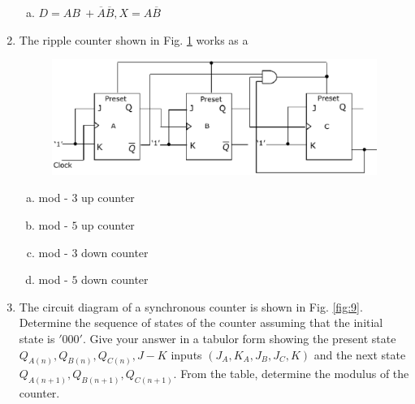 \documentclass[journal,12pt,twocolumn]{IEEEtran}
\begin{document}
\begin{enumerate}
\begin{enumerate}[(a)]
\item $
D = AB \ +  \overline{A} \overline{B}, X  =  A \overline{B} 
$


\end{enumerate}

\item The ripple counter shown in Fig. \ref{fig:8} works as a

\begin{figure}

\centering

\includegraphics[width=\columnwidth]{./figs/10.eps}

\caption{}

\label{fig:8}

\end{figure} 



\begin{enumerate}[(a)]
 
\item mod - $3$ up counter

\item mod - $5$ up counter

\item mod - $3$ down counter

\item mod - $5$ down counter

\end{enumerate}

\item The circuit diagram of a synchronous counter is shown in Fig. \ref{fig:9}. Determine the sequence of states of the counter assuming that the initial state is $'000'$. Give your answer in a tabulor form showing the present state $Q_{A(n)},Q_{B(n)},Q_{C(n)},J-K$ inputs $(J_A,K_A,J_B,J_C,K)$ and the next state $Q_{A(n+1)},Q_{B(n+1)},Q_{C(n+1)}$. From the table, determine the modulus of the counter.

\begin{figure}

\centering


\end{figure}
\end{enumerate}
\end{document}
